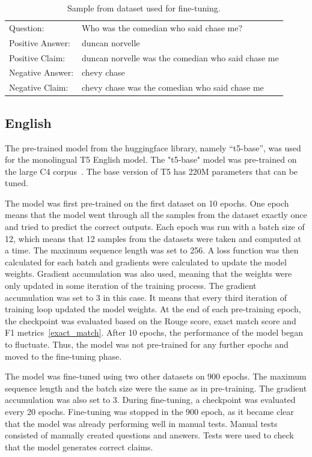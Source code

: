 \begin{table}[H]
    \centering
    \begin{tabular}{lp{7cm}}
        \hline
        Question: & Who was the comedian who said chase me? \\
        Positive Answer: & duncan norvelle \\
        Positive Claim: & duncan norvelle was the comedian who said chase me \\
        Negative Answer: & chevy chase \\
        Negative Claim: & chevy chase was the comedian who said chase me \\
        \hline
    \end{tabular}
    \caption{Sample from dataset used for fine-tuning.}
    \label{tab:t5_dataset2}
\end{table}

\subsection*{English}
The pre-trained model from the huggingface library, namely ``t5-base'', was used for the monolingual T5 English model. The "t5-base" model was pre-trained on the large C4 corpus~\cite{transformer}. The base version of T5 has 220M parameters that can be tuned.

The model was first pre-trained on the first dataset on 10 epochs. One epoch means that the model went through all the samples from the dataset exactly once and tried to predict the correct outputs. Each epoch was run with a batch size of 12, which means that 12 samples from the datasets were taken and computed at a time. The maximum sequence length was set to 256. A loss function was then calculated for each batch and gradients were calculated to update the model weights. Gradient accumulation was also used, meaning that the weights were only updated in some iteration of the training process. The gradient accumulation was set to 3 in this case. It means that every third iteration of training loop updated the model weights. At the end of each pre-training epoch, the checkpoint was evaluated based on the Rouge score, exact match score and F1 metrics~\ref{exact_match}. After 10 epochs, the performance of the model began to fluctuate. Thus, the model was not pre-trained for any further epochs and moved to the fine-tuning phase.

The model was fine-tuned using two other datasets on 900 epochs. The maximum sequence length and the batch size were the same as in pre-training. The gradient accumulation was also set to 3. During fine-tuning, a checkpoint was evaluated every 20 epochs. Fine-tuning was stopped in the 900 epoch, as it became clear that the model was already performing well in manual tests. Manual tests consisted of manually created questions and answers. Tests were used to check that the model generates correct claims.

